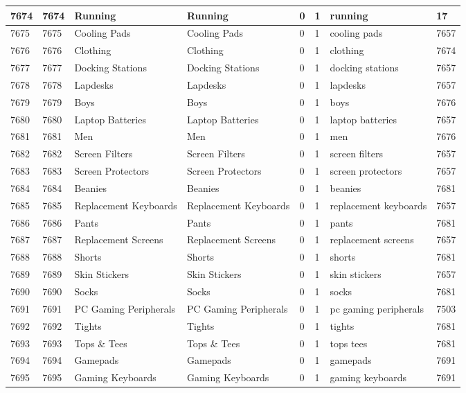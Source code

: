 \begin{longtable}{|l|l|l|l|l|l|l|l|}
7674 & 7674 & Running & Running & 0 & 1 & running & 17 \\ \hline 
7675 & 7675 & Cooling Pads & Cooling Pads & 0 & 1 & cooling pads & 7657 \\ \hline 
7676 & 7676 & Clothing & Clothing & 0 & 1 & clothing & 7674 \\ \hline 
7677 & 7677 & Docking Stations & Docking Stations & 0 & 1 & docking stations & 7657 \\ \hline 
7678 & 7678 & Lapdesks & Lapdesks & 0 & 1 & lapdesks & 7657 \\ \hline 
7679 & 7679 & Boys & Boys & 0 & 1 & boys & 7676 \\ \hline 
7680 & 7680 & Laptop Batteries & Laptop Batteries & 0 & 1 & laptop batteries & 7657 \\ \hline 
7681 & 7681 & Men & Men & 0 & 1 & men & 7676 \\ \hline 
7682 & 7682 & Screen Filters & Screen Filters & 0 & 1 & screen filters & 7657 \\ \hline 
7683 & 7683 & Screen Protectors & Screen Protectors & 0 & 1 & screen protectors & 7657 \\ \hline 
7684 & 7684 & Beanies & Beanies & 0 & 1 & beanies & 7681 \\ \hline 
7685 & 7685 & Replacement Keyboards & Replacement Keyboards & 0 & 1 & replacement keyboards & 7657 \\ \hline 
7686 & 7686 & Pants & Pants & 0 & 1 & pants & 7681 \\ \hline 
7687 & 7687 & Replacement Screens & Replacement Screens & 0 & 1 & replacement screens & 7657 \\ \hline 
7688 & 7688 & Shorts & Shorts & 0 & 1 & shorts & 7681 \\ \hline 
7689 & 7689 & Skin Stickers & Skin Stickers & 0 & 1 & skin stickers & 7657 \\ \hline 
7690 & 7690 & Socks & Socks & 0 & 1 & socks & 7681 \\ \hline 
7691 & 7691 & PC Gaming Peripherals & PC Gaming Peripherals & 0 & 1 & pc gaming peripherals & 7503 \\ \hline 
7692 & 7692 & Tights & Tights & 0 & 1 & tights & 7681 \\ \hline 
7693 & 7693 & Tops \& Tees & Tops \& Tees & 0 & 1 & tops tees & 7681 \\ \hline 
7694 & 7694 & Gamepads & Gamepads & 0 & 1 & gamepads & 7691 \\ \hline 
7695 & 7695 & Gaming Keyboards & Gaming Keyboards & 0 & 1 & gaming keyboards & 7691 \\ \hline 

\end{longtable}
